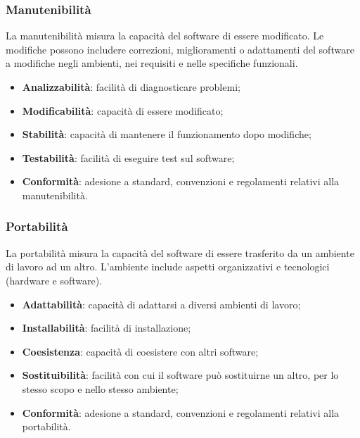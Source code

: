 \subsubsection{Manutenibilità}
La manutenibilità misura la capacità del software di essere modificato.
Le modifiche possono includere correzioni, miglioramenti o adattamenti del software
a modifiche negli ambienti, nei requisiti e nelle specifiche funzionali.
\begin{itemize}
    \item \textbf{Analizzabilità}: facilità di diagnosticare problemi;
    \item \textbf{Modificabilità}: capacità di essere modificato;
    \item \textbf{Stabilità}: capacità di mantenere il funzionamento dopo modifiche;
    \item \textbf{Testabilità}: facilità di eseguire test sul software;
    \item \textbf{Conformità}: adesione a standard, convenzioni e regolamenti relativi alla manutenibilità.
\end{itemize}

\subsubsection{Portabilità}
La portabilità misura la capacità del software di essere trasferito da un ambiente di lavoro ad un altro.
L'ambiente include aspetti organizzativi e tecnologici (hardware e software).
\begin{itemize}
    \item \textbf{Adattabilità}: capacità di adattarsi a diversi ambienti di lavoro;
    \item \textbf{Installabilità}: facilità di installazione;
    \item \textbf{Coesistenza}: capacità di coesistere con altri software;
    \item \textbf{Sostituibilità}: facilità con cui il software può sostituirne un altro, per lo 
        stesso scopo e nello stesso ambiente;
    \item \textbf{Conformità}: adesione a standard, convenzioni e regolamenti relativi alla portabilità.
\end{itemize}
